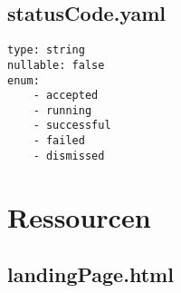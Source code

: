 \subsection{statusCode.yaml}
\begin{lstlisting}[caption={statusCode.yaml}, style = JSON]
type: string
nullable: false
enum:
    - accepted
    - running
    - successful
    - failed
    - dismissed
\end{lstlisting}\label{appendixstatusCodeyaml}

\section{Ressourcen}
\renewcommand{\lstlistingname}{Ressource}
\subsection{landingPage.html}
